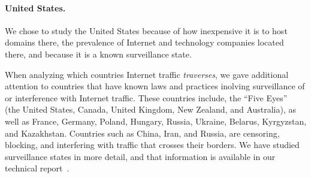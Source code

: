 \paragraph{United States.}  We chose to study the United States because
of how inexpensive it is to host domains there, the prevalence of
Internet and technology companies located there, and because it is a
known surveillance state. 

When analyzing which countries Internet traffic {\em traverses}, we gave
additional attention to countries that have known laws and practices
inolving surveillance of or interference with Internet traffic.
These countries include, the ``Five Eyes''
~\cite{lander2004international, eyeswideopen} (the United States,
Canada, United Kingdom, New Zealand, and Australia), as well as France,
Germany, Poland, Hungary, Russia, Ukraine, Belarus, Kyrgyzstan, and
Kazakhstan.  Countries such as China, Iran, and
Russia, are censoring, blocking, and interfering with traffic that
crosses their borders.  We have studied surveillance states in more
detail, and that information is available in our technical report~\cite{characterizing_detours}. 


